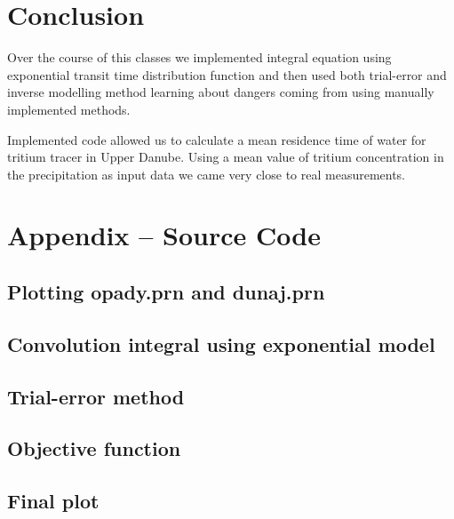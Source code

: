 \documentclass[12pt]{article}
\begin{document}
\section{Conclusion}

Over the course of this classes we implemented integral equation using exponential transit time distribution function and then used both trial-error and inverse modelling method learning about dangers coming from using manually implemented methods.

Implemented code allowed us to calculate a mean residence time of water for tritium tracer in Upper Danube. Using a mean value of tritium concentration in the precipitation as input data we came very close to real measurements.

\section{Appendix -- Source Code}
\subsection{Plotting opady.prn and dunaj.prn}

\subsection{Convolution integral using exponential model}
\label{code:convInt}

\subsection{Trial-error method}
\label{code:trialError}

\subsection{Objective function}
\label{code:objective}


\subsection{Final plot}
\label{code:finalPlot}

\end{document}
